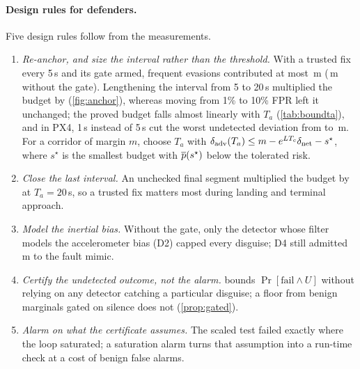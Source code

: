 \paragraph{Design rules for defenders.}
Five design rules follow from the measurements.
\begin{enumerate}
\item \emph{Re-anchor, and size the interval rather than the threshold.} With a
  trusted fix every 5\,s and its gate armed, frequent evasions contributed at
  most \nGatedCap\,m (\nNgMax\,m without the gate). Lengthening the interval
  from 5 to 20\,s multiplied the budget by \nAnchorMultTwenty{}
  (\cref{fig:anchor}), whereas moving from 1\% to 10\% FPR left it unchanged;
  the proved budget falls almost linearly with $T_a$ (\cref{tab:boundta}), and
  in PX4, 1\,s instead of 5\,s cut the worst undetected deviation from
  \nPxWorstAllGate{} to \nPxTaWorstAllGate\,m. For a corridor of margin $m$,
  choose $T_a$ with $\delta_{\mathrm{adv}}(T_a)\le m-e^{LT_c}\delta_{\mathrm{net}}-s^\star$, where $s^\star$ is
  the smallest budget with $\overline{p}(s^\star)$ below the tolerated risk.
\item \emph{Close the last interval.} An unchecked final segment multiplied the
  budget by \nOpenRatioTwenty{} at $T_a=20$\,s, so a trusted fix matters most
  during landing and terminal approach.
\item \emph{Model the inertial bias.} Without the gate, only the detector whose
  filter models the accelerometer bias (D2) capped every disguise; D4 still
  admitted \nNgCapDFour\,m to the fault mimic.
\item \emph{Certify the undetected outcome, not the alarm.} 
  bounds $\Pr[\text{fail}\wedge U]$ without relying on any detector catching a
  particular disguise; a floor from benign marginals gated on silence does not
  (\cref{prop:gated}).
\item \emph{Alarm on what the certificate assumes.} The scaled test failed
  exactly where the loop saturated; a saturation alarm turns that assumption
  into a run-time check at a cost of \nRevSatAlone{} benign false alarms.
\end{enumerate}

